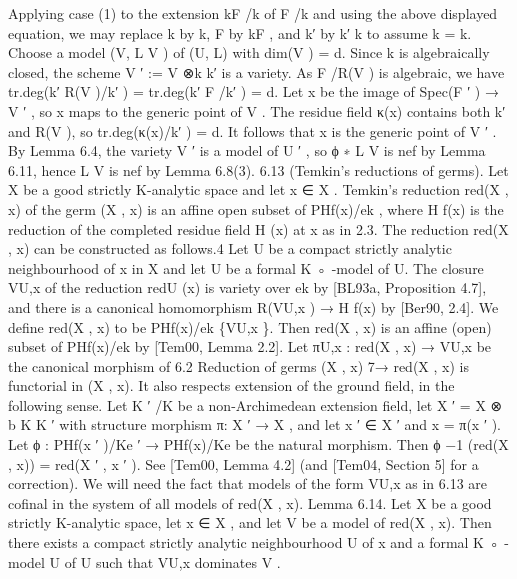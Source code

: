 \documentclass[
  10pt,
]{article}
\newenvironment{Shaded}{}{}
\newcommand{\NormalTok}[1]{#1}
\begin{document}
\begin{Shaded}
\begin{Highlighting}[]
\NormalTok{Applying case (1) to the extension kF /k of F /k and using the above displayed equation,}
\NormalTok{we may replace k by k, F by kF , and k′ by k′ k to assume k = k.}
\NormalTok{   Choose a model (V, L V ) of (U, L) with dim(V ) = d. Since k is algebraically closed, the}
\NormalTok{scheme V ′ := V ⊗k k′ is a variety. As F /R(V ) is algebraic, we have tr.deg(k′ R(V )/k′ ) =}
\NormalTok{tr.deg(k′ F /k′ ) = d. Let x be the image of Spec(F ′ ) → V ′ , so x maps to the generic point}
\NormalTok{of V . The residue field κ(x) contains both k′ and R(V ), so tr.deg(κ(x)/k′ ) = d. It follows}
\NormalTok{that x is the generic point of V ′ . By Lemma 6.4, the variety V ′ is a model of U ′ , so ϕ ∗ L V}
\NormalTok{is nef by Lemma 6.11, hence L V is nef by Lemma 6.8(3).                                        }
\NormalTok{6.13 (Temkin’s reductions of germs). Let X be a good strictly K{-}analytic space and let}
\NormalTok{x ∈ X . Temkin’s reduction red(X , x) of the germ (X , x) is an affine open subset of}
\NormalTok{PHf(x)/ek , where H    f(x) is the reduction of the completed residue field H (x) at x as in 2.3.}
\NormalTok{The reduction red(X , x) can be constructed as follows.4 Let U be a compact strictly}
\NormalTok{analytic neighbourhood of x in X and let U be a formal K ◦ {-}model of U. The closure}
\NormalTok{VU,x of the reduction redU (x) is variety over ek by [BL93a, Proposition 4.7], and there}
\NormalTok{is a canonical homomorphism R(VU,x ) → H             f(x) by [Ber90, 2.4]. We define red(X , x)}
\NormalTok{to be PHf(x)/ek \{VU,x \}. Then red(X , x) is an affine (open) subset of PHf(x)/ek by [Tem00,}
\NormalTok{Lemma 2.2]. Let πU,x : red(X , x) → VU,x be the canonical morphism of 6.2}
\NormalTok{   Reduction of germs (X , x) 7→ red(X , x) is functorial in (X , x). It also respects extension}
\NormalTok{of the ground field, in the following sense. Let K ′ /K be a non{-}Archimedean extension}
\NormalTok{field, let X ′ = X ⊗   b K K ′ with structure morphism π: X ′ → X , and let x ′ ∈ X ′ and x = π(x ′ ).}
\NormalTok{Let ϕ : PHf(x ′ )/Ke ′ → PHf(x)/Ke be the natural morphism. Then ϕ −1 (red(X , x)) = red(X ′ , x ′ ).}
\NormalTok{See [Tem00, Lemma 4.2] (and [Tem04, Section 5] for a correction).}
\NormalTok{   We will need the fact that models of the form VU,x as in 6.13 are cofinal in the system}
\NormalTok{of all models of red(X , x).}
\NormalTok{Lemma 6.14. Let X be a good strictly K{-}analytic space, let x ∈ X , and let V be a model of}
\NormalTok{red(X , x). Then there exists a compact strictly analytic neighbourhood U of x and a formal}
\NormalTok{K ◦ {-}model U of U such that VU,x dominates V .}

\end{Highlighting}
\end{Shaded}
\end{document}
